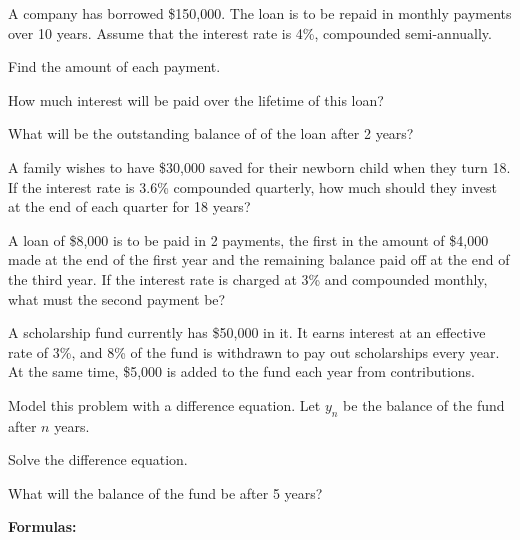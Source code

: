 \documentclass[12pt,legalpaper]{exam}
\begin{document}
\begin{questions}
\question[4] A company has borrowed \$150,000.  The loan is to be repaid in monthly payments over 10 years.  Assume that the interest rate is 4\%, compounded semi-annually.
\begin{compactenum}[(a)]
\item Find the amount of each payment.
\vspace{10cm}

\item How much interest will be paid over the lifetime of this loan?
\vspace{8cm}

\item What will be the outstanding balance of of the loan after 2 years?
\end{compactenum}
\newpage

\question[3] A family wishes to have \$30,000 saved for their newborn child when they turn 18.  If the interest rate is 3.6\% compounded quarterly, how much should they invest at the end of each quarter for 18 years?
\vspace{13cm}

\question[3] A loan of \$8,000 is to be paid in 2 payments, the first in the amount of \$4,000 made at the end of the first year and the remaining balance paid off at the end of the third year.  If the interest rate is charged at 3\% and compounded monthly, what must the second payment be?
\newpage

\question[4] A scholarship fund currently has \$50,000 in it.  It earns interest at an effective rate of 3\%, and  8\% of the fund is withdrawn to pay out scholarships every year.  At the same time, \$5,000 is added to the fund each year from contributions.
\begin{compactenum}[(a)]
\item Model this problem with a difference equation.  Let $y_{n}$ be the balance of the fund after $n$ years.
\vspace{5cm}

\item Solve the difference equation.
\vspace{8cm}

\item What will the balance of the fund be after 5 years?
\end{compactenum}
\newpage
\end{questions}
\large
\textbf{Formulas:}
\end{document}
